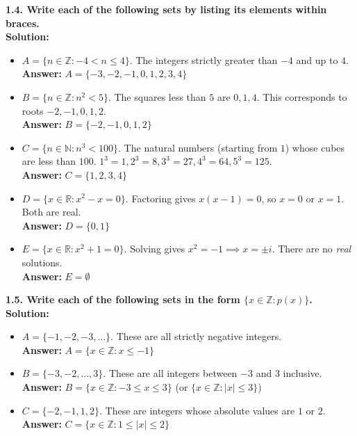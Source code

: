 \documentclass[12pt]{article}
\begin{document}
\vspace{0.5cm}
\textbf{1.4. Write each of the following sets by listing its elements within braces.} \\
\textbf{Solution:}
\begin{itemize}
    \item[(a)] $A = \{n \in \mathbb{Z} : -4 < n \le 4\}$. The integers strictly greater than $-4$ and up to $4$. \\
    \textbf{Answer:} $A = \{-3, -2, -1, 0, 1, 2, 3, 4\}$
    \item[(b)] $B = \{n \in \mathbb{Z} : n^2 < 5\}$. The squares less than $5$ are $0, 1, 4$. This corresponds to roots $-2, -1, 0, 1, 2$. \\
    \textbf{Answer:} $B = \{-2, -1, 0, 1, 2\}$
    \item[(c)] $C = \{n \in \mathbb{N} : n^3 < 100\}$. The natural numbers (starting from $1$) whose cubes are less than $100$. $1^3=1, 2^3=8, 3^3=27, 4^3=64, 5^3=125$. \\
    \textbf{Answer:} $C = \{1, 2, 3, 4\}$
    \item[(d)] $D = \{x \in \mathbb{R} : x^2 - x = 0\}$. Factoring gives $x(x - 1) = 0$, so $x = 0$ or $x = 1$. Both are real. \\
    \textbf{Answer:} $D = \{0, 1\}$
    \item[(e)] $E = \{x \in \mathbb{R} : x^2 + 1 = 0\}$. Solving gives $x^2 = -1 \implies x = \pm i$. There are no \textit{real} solutions. \\
    \textbf{Answer:} $E = \emptyset$
\end{itemize}

\vspace{0.5cm}
\textbf{1.5. Write each of the following sets in the form $\{x \in \mathbb{Z} : p(x)\}$.} \\
\textbf{Solution:}
\begin{itemize}
    \item[(a)] $A = \{-1, -2, -3, \dots\}$. These are all strictly negative integers. \\
    \textbf{Answer:} $A = \{x \in \mathbb{Z} : x \le -1\}$
    \item[(b)] $B = \{-3, -2, \dots, 3\}$. These are all integers between $-3$ and $3$ inclusive. \\
    \textbf{Answer:} $B = \{x \in \mathbb{Z} : -3 \le x \le 3\}$ (or $\{x \in \mathbb{Z} : |x| \le 3\}$)
    \item[(c)] $C = \{-2, -1, 1, 2\}$. These are integers whose absolute values are $1$ or $2$. \\
    \textbf{Answer:} $C = \{x \in \mathbb{Z} : 1 \le |x| \le 2\}$
\end{itemize}
\end{document}
